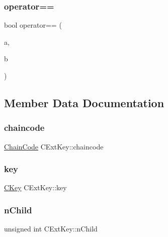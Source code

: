 \subsubsection{\texorpdfstring{operator==}{operator==}}
{\footnotesize\ttfamily bool operator== (\begin{DoxyParamCaption}\item[{const \mbox{\hyperlink{struct_c_ext_key}{C\+Ext\+Key}} \&}]{a,  }\item[{const \mbox{\hyperlink{struct_c_ext_key}{C\+Ext\+Key}} \&}]{b }\end{DoxyParamCaption})\hspace{0.3cm}{\ttfamily [friend]}}



\subsection{Member Data Documentation}
\mbox{\label{struct_c_ext_key_ab963200521bcc38d0f68c2d062b5da72}} 
\subsubsection{\texorpdfstring{chaincode}{chaincode}}
{\footnotesize\ttfamily \mbox{\hyperlink{hash_8h_aa201a9867f780a040c7af908e0a85db3}{Chain\+Code}} C\+Ext\+Key\+::chaincode}

\mbox{\label{struct_c_ext_key_a93cd93ef3311d9dbcf475282a5f80fb2}} 
\subsubsection{\texorpdfstring{key}{key}}
{\footnotesize\ttfamily \mbox{\hyperlink{class_c_key}{C\+Key}} C\+Ext\+Key\+::key}

\mbox{\label{struct_c_ext_key_ad15cb7ab68b59495eec71f6586803048}} 
\subsubsection{\texorpdfstring{n\+Child}{nChild}}
{\footnotesize\ttfamily unsigned int C\+Ext\+Key\+::n\+Child}

